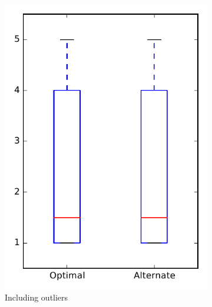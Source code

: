 
\begin{figure}
    \centering
    \begin{subfigure}{.4\textwidth}
        \centering
        \includegraphics[height=0.4\textheight]{figures/combo/dit_rq1_bookkeeper}
        \caption{Including outliers}\label{fig:combo:dit:rq1:bookkeeper_outlier}
    \end{subfigure}%
    \begin{subfigure}{.4\textwidth}
        \centering

\end{subfigure}
\end{figure}
